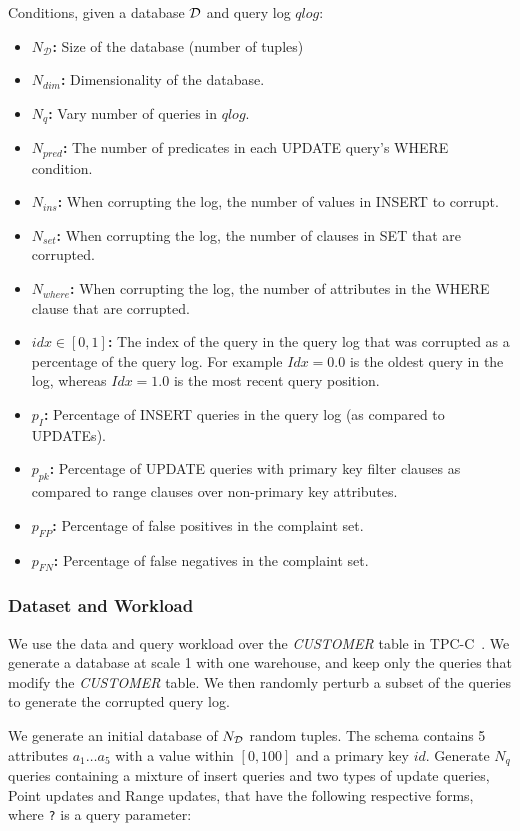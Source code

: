 Conditions, given a database ${\cal D}$ and query log $qlog$:

\begin{itemize}
\item {\bf $N_\mathcal{D}$: } Size of the database (number of tuples)
\item {\bf $N_{dim}$:} Dimensionality of the database.
\item {\bf $N_q$:} Vary number of queries in $qlog$.
\item {\bf $N_{pred}$:} The number of predicates in each UPDATE query's WHERE condition.
\item {\bf $N_{ins}$: } When corrupting the log, the number of values in INSERT to corrupt.
\item {\bf $N_{set}$: } When corrupting the log, the number of clauses in SET that are corrupted.
\item {\bf $N_{where}$: } When corrupting the log, the number of attributes in the WHERE clause that are corrupted.
\item {\bf $idx \in [0, 1]$: } The index of the query in the query log that was corrupted as a percentage of the query log.  
      For example $Idx = 0.0$ is the oldest query in the log, whereas $Idx = 1.0$ is the most recent query position.
\item {\bf $p_{I}$: } Percentage of INSERT queries in the query log (as compared to UPDATEs).
\item {\bf $p_{pk}$: } Percentage of UPDATE queries with primary key filter clauses as compared to range clauses over non-primary key attributes.
\item {\bf $p_{FP}$: } Percentage of false positives in the complaint set.
\item {\bf $p_{FN}$: } Percentage of false negatives in the complaint set.
\end{itemize}

\subsubsection{Dataset and Workload}


 We use the data and query workload over the {\it
CUSTOMER} table in TPC-C~\cite{}.  We generate a database at scale
1 with one warehouse, and keep only the queries that modify the
{\it CUSTOMER} table.  We then randomly perturb a subset of the
queries to generate the corrupted query log.

We generate an initial database of $N_{\cal D}$ random tuples.  
The schema contains 5 attributes $a_1\ldots a_5$ with a value
within $[0, 100]$ and a primary key $id$. 
Generate $N_q$ queries containing a mixture of insert queries 
and two types of update
queries, Point updates and Range updates, that have the following respective forms, 
where \verb|?| is a query parameter:


